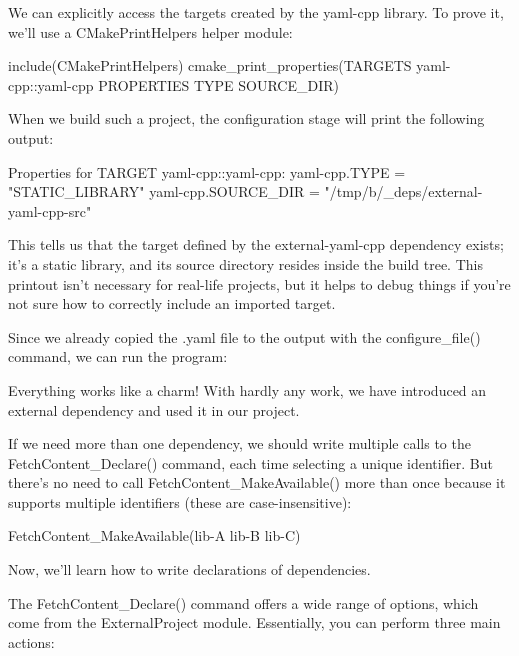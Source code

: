 We can explicitly access the targets created by the yaml-cpp library. To prove it, we’ll use a CMakePrintHelpers helper module:

\begin{cmake}
include(CMakePrintHelpers)
cmake_print_properties(TARGETS yaml-cpp::yaml-cpp
                       PROPERTIES TYPE SOURCE_DIR)
\end{cmake}

When we build such a project, the configuration stage will print the following output:

\begin{shell}
Properties for TARGET yaml-cpp::yaml-cpp:
    yaml-cpp.TYPE = "STATIC_LIBRARY"
    yaml-cpp.SOURCE_DIR = "/tmp/b/_deps/external-yaml-cpp-src"
\end{shell}

This tells us that the target defined by the external-yaml-cpp dependency exists; it’s a static library, and its source directory resides inside the build tree. This printout isn’t necessary for real-life projects, but it helps to debug things if you’re not sure how to correctly include an imported target.

Since we already copied the .yaml file to the output with the configure\_file() command, we can run the program:


Everything works like a charm! With hardly any work, we have introduced an external dependency and used it in our project.

If we need more than one dependency, we should write multiple calls to the FetchContent\_Declare() command, each time selecting a unique identifier. But there’s no need to call FetchContent\_MakeAvailable() more than once because it supports multiple identifiers (these are case-insensitive):

\begin{cmake}
FetchContent_MakeAvailable(lib-A lib-B lib-C)
\end{cmake}

Now, we’ll learn how to write declarations of dependencies.


The FetchContent\_Declare() command offers a wide range of options, which come from the ExternalProject module. Essentially, you can perform three main actions:

